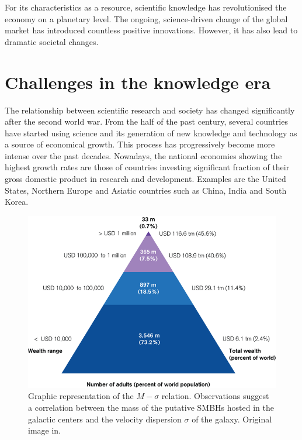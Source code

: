 For its characteristics as a resource, scientific knowledge has revolutionised the economy on a planetary level. The ongoing, science-driven change of the global market has introduced countless positive innovations. However, it has also lead to dramatic societal changes.   

\section{Challenges in the knowledge era} \label{Challenges_in_the_knowledge_era}
The relationship between scientific research and society has changed significantly after the second world war. From the half of the past century, several countries have started using science and its generation of new knowledge and technology as a source of economical growth. This process has progressively become more intense over the past decades. Nowadays, the national economies showing the highest growth rates are those of countries investing significant fraction of their gross domestic product in research and development. Examples are the United States, Northern Europe and Asiatic countries such as China, India and South Korea.   

\begin{figure}[!t] 
 \begin{center}
 \includegraphics[scale=0.3]{Images/Global_wealth_pyramid.png}
 \caption{Graphic representation of the $M - \sigma$ relation. Observations suggest a correlation between the mass of the putative SMBHs hosted in the galactic centers and the velocity dispersion $\sigma$ of the galaxy. Original image in.}
 \label{M_sigma_relation}
 \end{center}
\end{figure}

